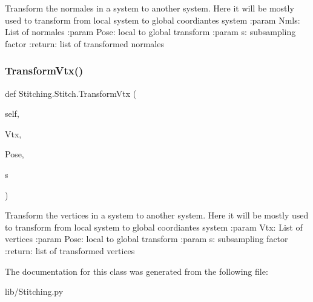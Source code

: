 \begin{DoxyVerb}Transform the normales in a system to another system.
Here it will be mostly used to transform from local system to global coordiantes system
:param Nmls:  List of normales
:param Pose: local to global transform
:param s: subsampling factor
:return: list of transformed normales
\end{DoxyVerb}
 \mbox{\label{class_stitching_1_1_stitch_addf2733c95c1a99895485f639989c971}} 
\subsubsection{Transform\+Vtx()}
{\footnotesize\ttfamily def Stitching.\+Stitch.\+Transform\+Vtx (\begin{DoxyParamCaption}\item[{}]{self,  }\item[{}]{Vtx,  }\item[{}]{Pose,  }\item[{}]{s }\end{DoxyParamCaption})}

\begin{DoxyVerb}Transform the vertices in a system to another system.
Here it will be mostly used to transform from local system to global coordiantes system
:param Vtx: List of vertices
:param Pose:  local to global transform
:param s: subsampling factor
:return: list of transformed vertices
\end{DoxyVerb}
 

The documentation for this class was generated from the following file\+:\begin{DoxyCompactItemize}
\item 
lib/Stitching.\+py\end{DoxyCompactItemize}
